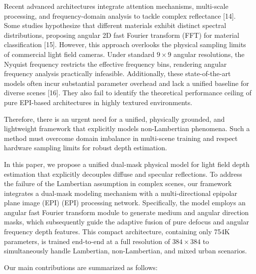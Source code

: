 Recent advanced architectures integrate attention mechanisms, multi-scale processing, and frequency-domain analysis to tackle complex reflectance [14]. Some studies hypothesize that different materials exhibit distinct spectral distributions, proposing angular 2D fast Fourier transform (FFT) for material classification [15]. However, this approach overlooks the physical sampling limits of commercial light field cameras. Under standard $9 \times 9$ angular resolutions, the Nyquist frequency restricts the effective frequency bins, rendering angular frequency analysis practically infeasible. Additionally, these state-of-the-art models often incur substantial parameter overhead and lack a unified baseline for diverse scenes [16]. They also fail to identify the theoretical performance ceiling of pure EPI-based architectures in highly textured environments.

Therefore, there is an urgent need for a unified, physically grounded, and lightweight framework that explicitly models non-Lambertian phenomena. Such a method must overcome domain imbalance in multi-scene training and respect hardware sampling limits for robust depth estimation.

In this paper, we propose a unified dual-mask physical model for light field depth estimation that explicitly decouples diffuse and specular reflections. To address the failure of the Lambertian assumption in complex scenes, our framework integrates a dual-mask modeling mechanism with a multi-directional epipolar plane image (EPI) (EPI) processing network. Specifically, the model employs an angular fast Fourier transform module to generate medium and angular direction masks, which subsequently guide the adaptive fusion of pure defocus and angular frequency depth features. This compact architecture, containing only 754K parameters, is trained end-to-end at a full resolution of $384 \times 384$ to simultaneously handle Lambertian, non-Lambertian, and mixed urban scenarios.

Our main contributions are summarized as follows:

